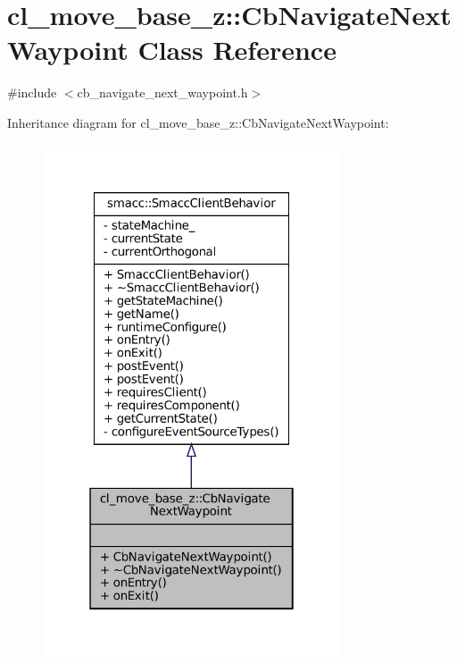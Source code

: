 \hypertarget{classcl__move__base__z_1_1CbNavigateNextWaypoint}{}\section{cl\+\_\+move\+\_\+base\+\_\+z\+:\+:Cb\+Navigate\+Next\+Waypoint Class Reference}
\label{classcl__move__base__z_1_1CbNavigateNextWaypoint}


{\ttfamily \#include $<$cb\+\_\+navigate\+\_\+next\+\_\+waypoint.\+h$>$}



Inheritance diagram for cl\+\_\+move\+\_\+base\+\_\+z\+:\+:Cb\+Navigate\+Next\+Waypoint\+:
\nopagebreak
\begin{figure}[H]
\begin{center}
\leavevmode
\includegraphics[width=250pt]{classcl__move__base__z_1_1CbNavigateNextWaypoint__inherit__graph}
\end{center}
\end{figure}


